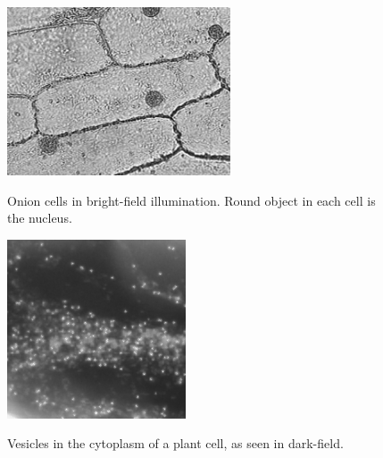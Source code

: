 \documentclass{../lab}
\begin{document}
\begin{figure}[h]
\begin{minipage}[t]{.475\textwidth}
    \centering
    \href{http://experimentationlab.berkeley.edu/sites/default/files/images/250px-Image005.png}{\includegraphics[width=\linewidth,keepaspectratio]{images/250px-Image005.png}}
    \caption{Onion cells in bright-field illumination. Round object in each cell is the nucleus.}
\end{minipage}\hfill
\begin{minipage}[t]{.475\textwidth}
    \centering
    \href{http://experimentationlab.berkeley.edu/sites/default/files/images/Image003.png}{\includegraphics[width=\linewidth,keepaspectratio]{images/Image003.png}}
    \caption{Vesicles in the cytoplasm of a plant cell, as seen in dark-field.}
\end{minipage}
\end{figure}
\end{document}

